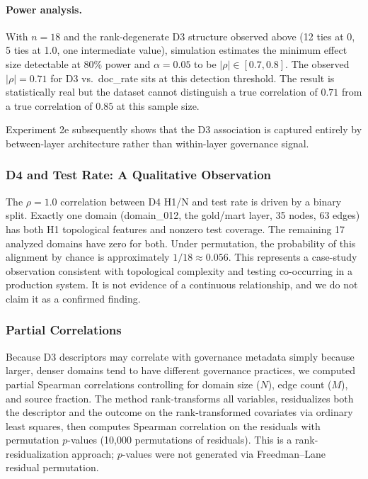 \documentclass[11pt,a4paper]{article}
\begin{document}
\paragraph{Power analysis.}
With $n = 18$ and the rank-degenerate D3 structure observed above
(12 ties at 0, 5 ties at 1.0, one intermediate value), simulation
estimates the minimum effect size detectable at 80\% power and
$\alpha = 0.05$ to be $|\rho| \in [0.7, 0.8]$. The observed $|\rho|
= 0.71$ for D3 vs.\ doc\_rate sits at this detection threshold. The
result is statistically real but the dataset cannot distinguish a
true correlation of $0.71$ from a true correlation of $0.85$ at this
sample size.

Experiment 2e subsequently shows that the D3 association is captured
entirely by between-layer architecture rather than within-layer
governance signal.

\subsubsection{D4 and Test Rate: A Qualitative Observation}

The $\rho = 1.0$ correlation between D4 H1/N and test rate is driven
by a binary split. Exactly one domain (domain\_012, the gold/mart
layer, 35 nodes, 63 edges) has both H1 topological features and
nonzero test coverage. The remaining 17 analyzed domains have zero for
both. Under permutation, the probability of this alignment by chance is
approximately $1/18 \approx 0.056$. This represents a case-study
observation consistent with topological complexity and testing
co-occurring in a production system. It is not evidence of a continuous
relationship, and we do not claim it as a confirmed finding.

\subsubsection{Partial Correlations}

Because D3 descriptors may correlate with governance metadata simply
because larger, denser domains tend to have different governance
practices, we computed partial Spearman correlations controlling for
domain size ($N$), edge count ($M$), and source fraction. The method
rank-transforms all variables, residualizes both the descriptor and
the outcome on the rank-transformed covariates via ordinary least
squares, then computes Spearman correlation on the residuals with
permutation $p$-values (10,000 permutations of residuals). This is a
rank-residualization approach; $p$-values were not generated via
Freedman--Lane residual permutation.
\end{document}
